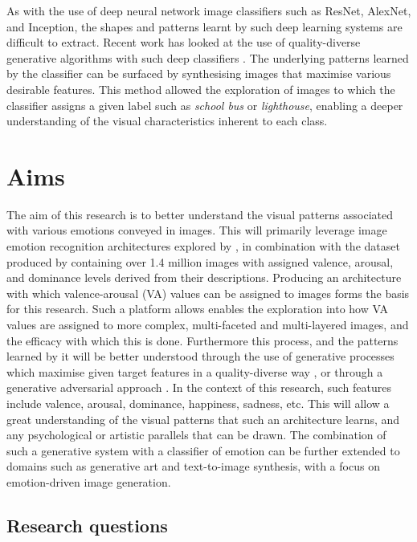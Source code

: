 \documentclass{article}
\begin{document}
As with the use of deep neural network image classifiers such as ResNet, AlexNet, and Inception, the shapes and patterns learnt by such deep learning systems are difficult to extract.
Recent work has looked at the use of quality-diverse generative algorithms with such deep classifiers \citep{nguyen2015deep, nguyen2015innovation}.
The underlying patterns learned by the classifier can be surfaced by synthesising images that maximise various desirable features.
This method allowed the exploration of images to which the classifier assigns a given label such as \textit{school bus} or \textit{lighthouse}, enabling a deeper understanding of the visual characteristics inherent to each class.

\section{Aims}
The aim of this research is to better understand the visual patterns associated with various emotions conveyed in images.
This will primarily leverage image emotion recognition architectures explored by \citet{kim2018building}, in combination with the dataset produced by \citet{zhao2016predicting} containing over 1.4 million images with assigned valence, arousal, and dominance levels derived from their descriptions.
Producing an architecture with which valence-arousal (VA) values can be assigned to images forms the basis for this research.
Such a platform allows enables the exploration into how VA values are assigned to more complex, multi-faceted and multi-layered images, and the efficacy with which this is done.
Furthermore this process, and the patterns learned by it will be better understood through the use of generative processes which maximise given target features in a quality-diverse way \citep{nguyen2015innovation, nguyen2015deep}, or through a generative adversarial approach \citep{tan2017artgan}.
In the context of this research, such features include valence, arousal, dominance, happiness, sadness, etc.
This will allow a great understanding of the visual patterns that such an architecture learns, and any psychological or artistic parallels that can be drawn.
The combination of such a generative system with a classifier of emotion can be further extended to domains such as generative art and text-to-image synthesis, with a focus on emotion-driven image generation.

\subsection{Research questions}
\end{document}
